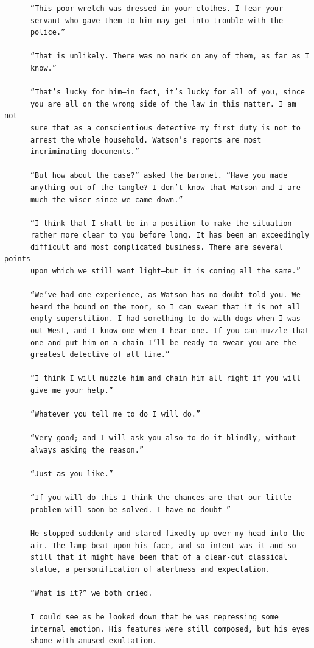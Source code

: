 \documentclass{article}
\begin{document}
\begin{verbatim}
      “This poor wretch was dressed in your clothes. I fear your
      servant who gave them to him may get into trouble with the
      police.”

      “That is unlikely. There was no mark on any of them, as far as I
      know.”

      “That’s lucky for him—in fact, it’s lucky for all of you, since
      you are all on the wrong side of the law in this matter. I am not
      sure that as a conscientious detective my first duty is not to
      arrest the whole household. Watson’s reports are most
      incriminating documents.”

      “But how about the case?” asked the baronet. “Have you made
      anything out of the tangle? I don’t know that Watson and I are
      much the wiser since we came down.”

      “I think that I shall be in a position to make the situation
      rather more clear to you before long. It has been an exceedingly
      difficult and most complicated business. There are several points
      upon which we still want light—but it is coming all the same.”

      “We’ve had one experience, as Watson has no doubt told you. We
      heard the hound on the moor, so I can swear that it is not all
      empty superstition. I had something to do with dogs when I was
      out West, and I know one when I hear one. If you can muzzle that
      one and put him on a chain I’ll be ready to swear you are the
      greatest detective of all time.”

      “I think I will muzzle him and chain him all right if you will
      give me your help.”

      “Whatever you tell me to do I will do.”

      “Very good; and I will ask you also to do it blindly, without
      always asking the reason.”

      “Just as you like.”

      “If you will do this I think the chances are that our little
      problem will soon be solved. I have no doubt—”

      He stopped suddenly and stared fixedly up over my head into the
      air. The lamp beat upon his face, and so intent was it and so
      still that it might have been that of a clear-cut classical
      statue, a personification of alertness and expectation.

      “What is it?” we both cried.

      I could see as he looked down that he was repressing some
      internal emotion. His features were still composed, but his eyes
      shone with amused exultation.


\end{verbatim}
\end{document}
